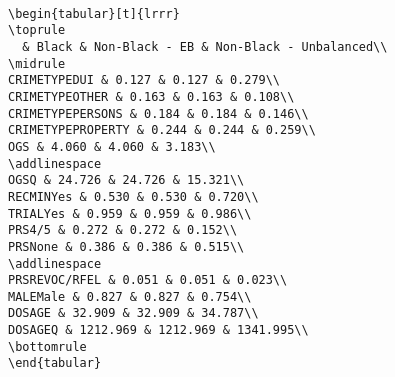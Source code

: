 \documentclass[
  letterpaper,
  DIV=11,
  numbers=noendperiod]{scrartcl}
\newenvironment{Shaded}{\begin{snugshade}}{\end{snugshade}}
\newcommand{\AttributeTok}[1]{\textcolor[rgb]{0.40,0.45,0.13}{#1}}
\newcommand{\ConstantTok}[1]{\textcolor[rgb]{0.56,0.35,0.01}{#1}}
\newcommand{\DecValTok}[1]{\textcolor[rgb]{0.68,0.00,0.00}{#1}}
\newcommand{\FunctionTok}[1]{\textcolor[rgb]{0.28,0.35,0.67}{#1}}
\newcommand{\NormalTok}[1]{\textcolor[rgb]{0.00,0.23,0.31}{#1}}
\newcommand{\OtherTok}[1]{\textcolor[rgb]{0.00,0.23,0.31}{#1}}
\newcommand{\SpecialCharTok}[1]{\textcolor[rgb]{0.37,0.37,0.37}{#1}}
\newcommand{\StringTok}[1]{\textcolor[rgb]{0.13,0.47,0.30}{#1}}
\begin{document}
\begin{Shaded}
\end{Shaded}

\begin{verbatim}

\begin{tabular}[t]{lrrr}
\toprule
  & Black & Non-Black - EB & Non-Black - Unbalanced\\
\midrule
CRIMETYPEDUI & 0.127 & 0.127 & 0.279\\
CRIMETYPEOTHER & 0.163 & 0.163 & 0.108\\
CRIMETYPEPERSONS & 0.184 & 0.184 & 0.146\\
CRIMETYPEPROPERTY & 0.244 & 0.244 & 0.259\\
OGS & 4.060 & 4.060 & 3.183\\
\addlinespace
OGSQ & 24.726 & 24.726 & 15.321\\
RECMINYes & 0.530 & 0.530 & 0.720\\
TRIALYes & 0.959 & 0.959 & 0.986\\
PRS4/5 & 0.272 & 0.272 & 0.152\\
PRSNone & 0.386 & 0.386 & 0.515\\
\addlinespace
PRSREVOC/RFEL & 0.051 & 0.051 & 0.023\\
MALEMale & 0.827 & 0.827 & 0.754\\
DOSAGE & 32.909 & 32.909 & 34.787\\
DOSAGEQ & 1212.969 & 1212.969 & 1341.995\\
\bottomrule
\end{tabular}
\end{verbatim}
\end{document}
